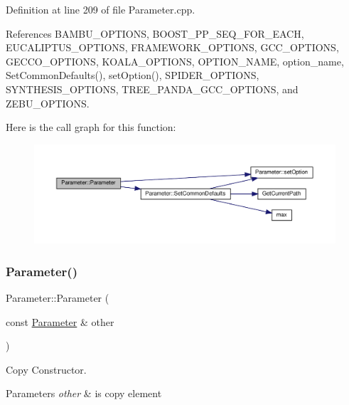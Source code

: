 Definition at line 209 of file Parameter.\+cpp.



References B\+A\+M\+B\+U\+\_\+\+O\+P\+T\+I\+O\+NS, B\+O\+O\+S\+T\+\_\+\+P\+P\+\_\+\+S\+E\+Q\+\_\+\+F\+O\+R\+\_\+\+E\+A\+CH, E\+U\+C\+A\+L\+I\+P\+T\+U\+S\+\_\+\+O\+P\+T\+I\+O\+NS, F\+R\+A\+M\+E\+W\+O\+R\+K\+\_\+\+O\+P\+T\+I\+O\+NS, G\+C\+C\+\_\+\+O\+P\+T\+I\+O\+NS, G\+E\+C\+C\+O\+\_\+\+O\+P\+T\+I\+O\+NS, K\+O\+A\+L\+A\+\_\+\+O\+P\+T\+I\+O\+NS, O\+P\+T\+I\+O\+N\+\_\+\+N\+A\+ME, option\+\_\+name, Set\+Common\+Defaults(), set\+Option(), S\+P\+I\+D\+E\+R\+\_\+\+O\+P\+T\+I\+O\+NS, S\+Y\+N\+T\+H\+E\+S\+I\+S\+\_\+\+O\+P\+T\+I\+O\+NS, T\+R\+E\+E\+\_\+\+P\+A\+N\+D\+A\+\_\+\+G\+C\+C\+\_\+\+O\+P\+T\+I\+O\+NS, and Z\+E\+B\+U\+\_\+\+O\+P\+T\+I\+O\+NS.

Here is the call graph for this function\+:
\nopagebreak
\begin{figure}[H]
\begin{center}
\leavevmode
\includegraphics[width=350pt]{dc/dab/classParameter_ad9b5b31ed2ef3489d993085da7452397_cgraph}
\end{center}
\end{figure}
\mbox{\label{classParameter_ad3f5d861da24673d97bd1bd206b0b89a}} 
\subsubsection{\texorpdfstring{Parameter()}{Parameter()}\hspace{0.1cm}{\footnotesize\ttfamily [2/2]}}
{\footnotesize\ttfamily Parameter\+::\+Parameter (\begin{DoxyParamCaption}\item[{const \hyperlink{classParameter}{Parameter} \&}]{other }\end{DoxyParamCaption})}



Copy Constructor. 


\begin{DoxyParams}{Parameters}
{\em other} & is copy element \\
\hline
\end{DoxyParams}


